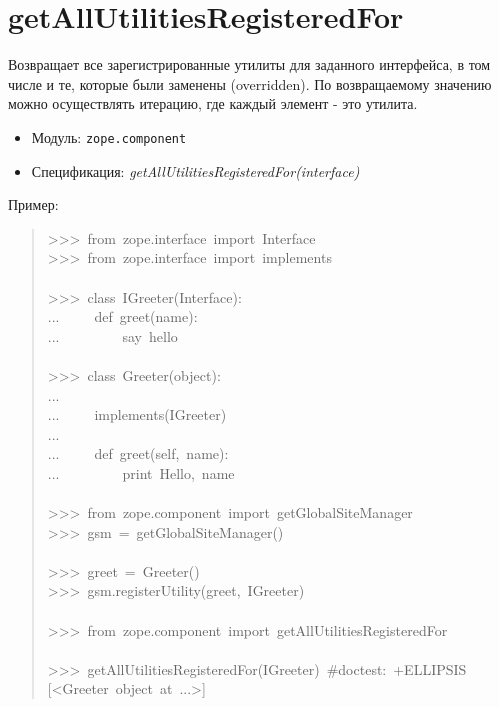 \documentclass[14pt,a4paper,openany,twoside,final]{extbook}
\providecommand*{\DUroletitlereference}[1]{\textsl{#1}}
\begin{document}
\section*{getAllUtilitiesRegisteredFor%
  \label{getallutilitiesregisteredfor}%
}

Возвращает все зарегистрированные утилиты для заданного интерфейса, в
том числе и те, которые были заменены (overridden).  По возвращаемому
значению можно осуществлять итерацию, где каждый элемент - это утилита.

\begin{itemize}

\item Модуль: \texttt{zope.component}

\item Спецификация: \DUroletitlereference{getAllUtilitiesRegisteredFor(interface)}

\end{itemize}

Пример:

\begin{quote}{\ttfamily \raggedright \noindent
>{}>{}>~from~zope.interface~import~Interface\\
>{}>{}>~from~zope.interface~import~implements\\
~\\
>{}>{}>~class~IGreeter(Interface):\\
...~~~~~def~greet(name):\\
...~~~~~~~~~\textquotedbl{}say~hello\textquotedbl{}\\
~\\
>{}>{}>~class~Greeter(object):\\
...\\
...~~~~~implements(IGreeter)\\
...\\
...~~~~~def~greet(self,~name):\\
...~~~~~~~~~print~\textquotedbl{}Hello\textquotedbl{},~name\\
~\\
>{}>{}>~from~zope.component~import~getGlobalSiteManager\\
>{}>{}>~gsm~=~getGlobalSiteManager()\\
~\\
>{}>{}>~greet~=~Greeter()\\
>{}>{}>~gsm.registerUtility(greet,~IGreeter)\\
~\\
>{}>{}>~from~zope.component~import~getAllUtilitiesRegisteredFor\\
~\\
>{}>{}>~getAllUtilitiesRegisteredFor(IGreeter)~\#doctest:~+ELLIPSIS\\
{[}<Greeter~object~at~...>{]}
}
\end{quote}
\end{document}

